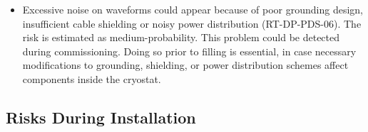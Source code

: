 \begin{itemize}
\item Excessive noise on  waveforms could appear because of poor grounding design, insufficient cable shielding or noisy power distribution (RT-DP-PDS-06). The risk is estimated as medium-probability. This problem could be detected during  commissioning. Doing so prior to  filling is essential, in case necessary modifications to grounding, shielding, or power distribution  schemes affect components inside the cryostat.

\end{itemize}


\subsection{Risks During Installation}
\label{sec:dp-pds-risks_installation}

